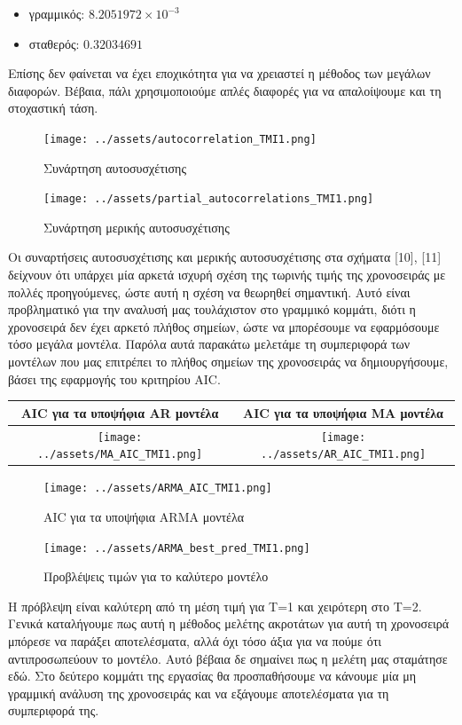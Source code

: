 \documentclass[11pt,]{article}
\providecommand{\tightlist}{%
  \setlength{\itemsep}{0pt}\setlength{\parskip}{0pt}}
\begin{document}
\begin{itemize}
\tightlist
\item
  γραμμικός: \(8.2051972\times 10^{-3}\)
\item
  σταθερός: \(0.32034691\)
\end{itemize}

Επίσης δεν φαίνεται να έχει εποχικότητα για να χρειαστεί η μέθοδος των
μεγάλων διαφορών. Βέβαια, πάλι χρησιμοποιούμε απλές διαφορές για να
απαλοίψουμε και τη στοχαστική τάση.

\begin{figure}
\centering
\texttt{[image: ../assets/autocorrelation\_TMI1.png]}
\caption{Συνάρτηση αυτοσυσχέτισης}
\end{figure}

\begin{figure}
\centering
\texttt{[image: ../assets/partial\_autocorrelations\_TMI1.png]}
\caption{Συνάρτηση μερικής αυτοσυσχέτισης}
\end{figure}

Οι συναρτήσεις αυτοσυσχέτισης και μερικής αυτοσυσχέτισης στα σχήματα
{[}10{]}, {[}11{]} δείχνουν ότι υπάρχει μία αρκετά ισχυρή σχέση της
τωρινής τιμής της χρονοσειράς με πολλές προηγούμενες, ώστε αυτή η σχέση
να θεωρηθεί σημαντική. Αυτό είναι προβληματικό για την αναλυσή μας
τουλάχιστον στο γραμμικό κομμάτι, διότι η χρονοσειρά δεν έχει αρκετό
πλήθος σημείων, ώστε να μπορέσουμε να εφαρμόσουμε τόσο μεγάλα μοντέλα.
Παρόλα αυτά παρακάτω μελετάμε τη συμπεριφορά των μοντέλων που μας
επιτρέπει το πλήθος σημείων της χρονοσειράς να δημιουργήσουμε, βάσει της
εφαρμογής του κριτηρίου AIC.

\begin{longtable}[]{@{}cc@{}}
\toprule
AIC για τα υποψήφια AR μοντέλα & AIC για τα υποψήφια MA
μοντέλα\tabularnewline
\midrule
\endhead
\texttt{[image: ../assets/MA\_AIC\_TMI1.png]}
&
\texttt{[image: ../assets/AR\_AIC\_TMI1.png]}\tabularnewline
\bottomrule
\end{longtable}

\begin{figure}
\centering
\texttt{[image: ../assets/ARMA\_AIC\_TMI1.png]}
\caption{AIC για τα υποψήφια ARMA μοντέλα}
\end{figure}

\begin{figure}
\centering
\texttt{[image: ../assets/ARMA\_best\_pred\_TMI1.png]}
\caption{Προβλέψεις τιμών για το καλύτερο μοντέλο}
\end{figure}

H πρόβλεψη είναι καλύτερη από τη μέση τιμή για T=1 και χειρότερη στο
T=2. Γενικά καταλήγουμε πως αυτή η μέθοδος μελέτης ακροτάτων για αυτή τη
χρονοσειρά μπόρεσε να παράξει αποτελέσματα, αλλά όχι τόσο άξια για να
πούμε ότι αντιπροσωπεύουν το μοντέλο. Αυτό βέβαια δε σημαίνει πως η
μελέτη μας σταμάτησε εδώ. Στο δεύτερο κομμάτι της εργασίας θα
προσπαθήσουμε να κάνουμε μία μη γραμμική ανάλυση της χρονοσειράς και να
εξάγουμε αποτελέσματα για τη συμπεριφορά της.
\end{document}
